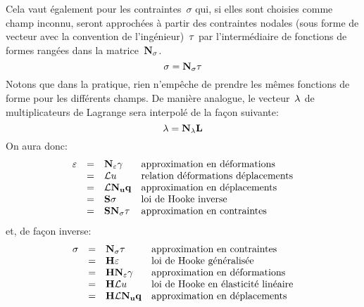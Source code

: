 Cela vaut également pour les contraintes~$\sigma$ qui, si elles sont choisies comme champ
inconnu, seront approchées à partir des contraintes nodales (sous forme de vecteur avec
la convention de l'ingénieur)~$\VV{\tau}$ par l'intermédiaire de fonctions de formes rangées
dans la matrice~$\MM{N_\sigma}$.
\begin{equation}
  \sigma = \MM{N_\sigma}\VV{\tau}
\end{equation}
Notons que dans la pratique, rien n'empêche de prendre les mêmes fonctions
de forme pour les différents champs.
\medskip
De manière analogue, le vecteur~$\VV{\lambda}$ de multiplicateurs
de Lagrange sera interpolé de la façon suivante:
\begin{equation}
  \VV{\lambda}=\MM{N_\lambda}\VV{L}
\end{equation}
\medskip
On aura donc:
\begin{equation}
  \begin{array}{rcll}
  \varepsilon &=& \MM{N_\varepsilon}\VV{\gamma}
           &\text{approximation en déformations}\\
          &=& \MM{\cL}u
           &\text{relation déformations déplacements}\\
          &=& \MM{\cL}\MM{N_u}\VV{q}
           &\text{approximation en déplacements}\\
          &=& \MM{S}\sigma
           &\text{loi de Hooke inverse}\\
          &=& \MM{S}\MM{N_\sigma}\VV{\tau}
           &\text{approximation en contraintes}
  \end{array}
\end{equation}
et, de façon inverse:
\begin{equation}
  \begin{array}{rcll}
  \sigma &=& \MM{N_\sigma}\VV{\tau}
           &\text{approximation en contraintes}\\
          &=& \MM{H}\varepsilon
           &\text{loi de Hooke généralisée}\\
          &=& \MM{H}\MM{N_\varepsilon}\VV{\gamma}
           &\text{approximation en déformations}\\
          &=& \MM{H}\MM{\cL}u
           &\text{loi de Hooke en élasticité linéaire}\\
          &=& \MM{H}\MM{\cL}\MM{N_u}\VV{q}
           &\text{approximation en déplacements}
  \end{array}
\end{equation}
